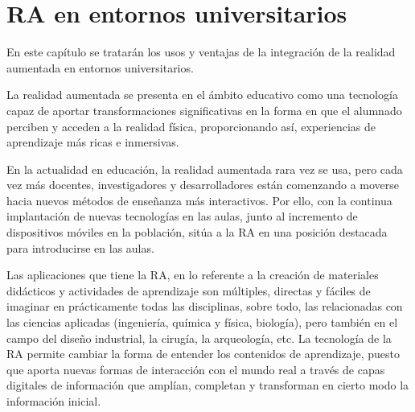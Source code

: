 %
%
%
%

\chapter{RA en entornos universitarios } \label{chap:RAEntornosUniversitarios}  

En este capítulo se tratarán los usos y ventajas de la integración de la realidad aumentada en entornos universitarios.

La realidad aumentada se presenta en el ámbito educativo como una tecnología capaz de aportar transformaciones significativas en la forma en que el alumnado perciben y acceden a la realidad física, proporcionando así, experiencias de aprendizaje más ricas e inmersivas.

En la actualidad en educación, la realidad aumentada rara vez se usa, pero cada vez más docentes, investigadores y desarrolladores están comenzando a moverse hacia nuevos métodos de enseñanza más interactivos. Por ello, con la continua implantación de nuevas tecnologías en las aulas, junto al incremento de dispositivos móviles en la población, sitúa a la RA en una posición destacada para introducirse en las aulas. 

Las aplicaciones que tiene la RA, en lo referente a la creación de materiales didácticos y actividades de aprendizaje son múltiples, directas y fáciles de imaginar en prácticamente todas las disciplinas, sobre todo, las relacionadas con las ciencias aplicadas (ingeniería, química y física, biología), pero también en el campo del diseño industrial, la cirugía, la arqueología, etc.
La tecnología de la RA permite cambiar la forma de entender los contenidos de aprendizaje, puesto que aporta nuevas formas de interacción con el mundo real a través de capas digitales de información que amplían, completan y transforman en cierto modo la información inicial.

